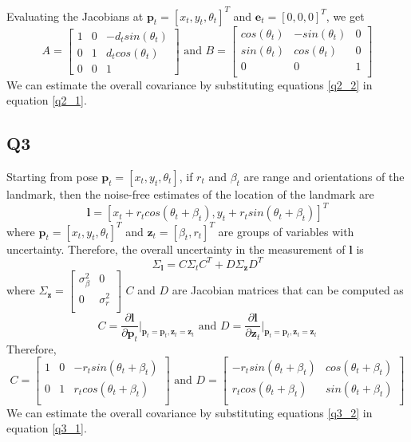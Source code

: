 \documentclass[12pt, a4paper]{article}
\begin{document}
Evaluating the Jacobians at $\mathbf{p}_t = [x_t, y_t, \theta_t]^T$ and $\mathbf{e}_t = [0, 0, 0]^T$, we get
\begin{equation}
  \label{q2_2}
A = \begin{bmatrix}
  1 & 0 & -d_tsin(\theta_t)\\
  0 & 1 & d_tcos(\theta_t)\\
  0 & 0 & 1
\end{bmatrix} \text{ and } B = \begin{bmatrix}
  cos(\theta_t) & -sin(\theta_t) & 0\\
  sin(\theta_t) & cos(\theta_t) & 0\\
  0  & 0 & 1\\
\end{bmatrix}
\end{equation}
We can estimate the overall covariance by substituting equations \ref{q2_2} in equation \ref{q2_1}.
\subsection{Q3}
Starting from pose $\mathbf{p}_t = \left[x_t, y_t, \theta_t\right]$, if $r_t$ and $\beta_t$ are range and orientations of the landmark, then the noise-free estimates of the location of the landmark are
\begin{equation}
  \label{q3_0}
  \mathbf{l} = \left[x_t + r_tcos(\theta_t + \beta_t), y_t + r_tsin(\theta_t + \beta_t)\right]^T
\end{equation}
where $\mathbf{p}_t = [x_t, y_t, \theta_t]^T$ and $\mathbf{z}_t = [\beta_t, r_t]^T$ are groups of variables with uncertainty.
Therefore, the overall uncertainty in the measurement of $\mathbf{l}$ is
\begin{equation}
  \label{q3_1}
  \Sigma_{\mathbf{l}} = C\Sigma_tC^T + D\Sigma_{\mathbf{z}}D^T
\end{equation}
  where $\Sigma_{\mathbf{z}} = \begin{bmatrix}
    \sigma_{\beta}^2 & 0\\
    0 & \sigma_r^2\\
  \end{bmatrix}$ $C$ and $D$ are Jacobian matrices that can be computed as
\[C = \frac{\partial \mathbf{l}}{\partial\mathbf{p}_t} \bigg\rvert_{\mathbf{p}_t=\mathbf{p}_t, \mathbf{z}_t=\mathbf{z}_t} \text{ and } D = \frac{\partial \mathbf{l}}{\partial\mathbf{z}_t} \bigg\rvert_{\mathbf{p}_t=\mathbf{p}_t, \mathbf{z}_t=\mathbf{z}_t}\]
Therefore,
\begin{equation}
  \label{q3_2}
C = \begin{bmatrix}
  1 & 0 & -r_tsin(\theta_t + \beta_t)\\
  0 & 1 & r_tcos(\theta_t + \beta_t)\\
\end{bmatrix} \text{ and } D = \begin{bmatrix}
  -r_tsin(\theta_t + \beta_t) & cos(\theta_t + \beta_t)\\
  r_tcos(\theta_t + \beta_t) & sin(\theta_t + \beta_t)\\
\end{bmatrix}
\end{equation}
We can estimate the overall covariance by substituting equations \ref{q3_2} in equation \ref{q3_1}.
\end{document}
